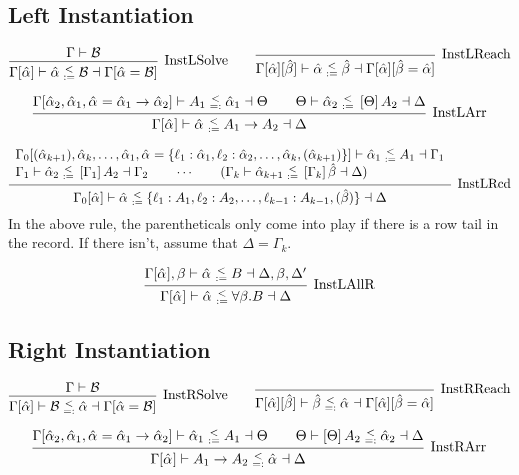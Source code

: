 \documentclass{article}
\newcommand{\B}{\mathcal{B}}
\newcommand{\instLSymbol}{\;\substack{<\\:=}\;}
\newcommand{\instRSymbol}{\;\substack{<\\=:}\;}
\newcommand{\ev}{\hat}
\newcommand{\spc}{\qquad}
\newcommand{\apply}[1]{\left[#1\right]}
\newcommand{\eva}[1][]{\ev \alpha_{#1}}
\newcommand{\evb}{\ev \beta}
\newcommand{\instL}[4]{#1 \vdash #2 \instLSymbol #3 \dashv #4}
\newcommand{\instR}[4]{#1 \vdash #2 \instRSymbol #3 \dashv #4}
\newcommand{\deduct}[3][]
{
  \begin{prooftree}
    \hypo{#2}
    \infer1[\text{#1}]{#3}
  \end{prooftree}
}
\begin{document}
\subsection{Left Instantiation}

\[
  \deduct[InstLSolve]
  {\Gamma \vdash \B}
  {\instL{\Gamma[\ev\alpha]}{\ev \alpha}{\B}{\Gamma[\ev\alpha = \B]}}
  \spc
  \deduct[InstLReach]
  {}
  {\instL{\Gamma[\ev\alpha][\ev\beta]}{\ev \alpha}{\ev
      \beta}{\Gamma[\ev\alpha][\ev\beta = \ev\alpha]}}
\]

\[
  \deduct[InstLArr] {\instR{\Gamma[\eva[2], \eva[1], \eva = \eva[1] \to
      \eva[2]]}{A_1}{\eva[1]}{\Theta} \spc \instL{\Theta}{\eva[2]}{\apply \Theta
      A_2}{\Delta} } {\instL{\Gamma[\eva]}{\eva}{A_1 \to A_2}{\Delta}}
\]

\[
  \deduct[InstLRcd]
  {
    \begin{array}{l}
     \instL{\Gamma_0[(\eva[k+1]), \eva[k], \dots, \eva[1], \eva=\{\ell_1 : \eva[1],
      \ell_2 : \eva[2], \dots, \eva[k], (\eva[k+1])\}]}{\eva[1]}{A_1}{\Gamma_1} \\
    \instL{\Gamma_1}{\eva[2]}{\apply{\Gamma_1} A_2}{\Gamma_2} \spc \cdots \spc
     (\instL{\Gamma_k}{\eva[k+1]}{\apply{\Gamma_k}\evb}{\Delta})
  \end{array}
  }
  {\instL{\Gamma_0[\eva]}{\eva}{\{\ell_1:A_1, \ell_2 : A_2, \dots, \ell_{k-1} : A_{k-1}, (\evb)\}}{\Delta}}
\]
In the above rule, the parentheticals only come into play if there is a row tail
in the record. If there isn't, assume that \(\Delta = \Gamma_k\).

\[
  \deduct[InstLAllR]
  { \instL{\Gamma[\eva], \beta}{\eva}{B}{\Delta, \beta, \Delta'} }
  { \instL{\Gamma[\eva]}{\eva}{\forall \beta. B}{\Delta} }
\]

\subsection{Right Instantiation}

\[
  \deduct[InstRSolve]
  {\Gamma \vdash \B}
  {\instR{\Gamma[\ev\alpha]}{\B}{\ev \alpha}{\Gamma[\ev\alpha = \B]}}
  \spc
  \deduct[InstRReach]
  {}
  {\instR{\Gamma[\ev\alpha][\ev\beta]}{\ev
      \beta}{\eva}{\Gamma[\ev\alpha][\ev\beta = \ev\alpha]}}
\]

\[
  \deduct[InstRArr] {\instL{\Gamma[\eva[2], \eva[1], \eva = \eva[1] \to
      \eva[2]]}{\eva[1]}{A_1}{\Theta} \spc \instR{\Theta}{\apply \Theta
      A_2}{\eva[2]}{\Delta} } {\instR{\Gamma[\eva]}{A_1 \to A_2}{\eva}{\Delta}}
\]
\end{document}
